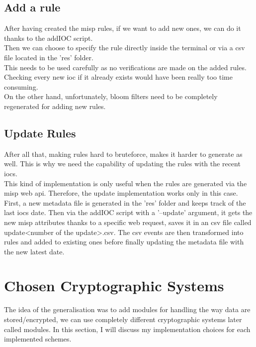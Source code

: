\documentclass{eplmastersthesis}
\begin{document}
\subsection{Add a rule}
After having created the \gls{misp} rules, if we want to add new ones, we can do it thanks to the addIOC script.\\
Then we can choose to specify the rule directly inside the terminal or via a \gls{csv} file located in the 'res' folder.\\
This needs to be used carefully as no verifications are made on the added rules. Checking every new \gls{ioc} if it already exists would have been really too time consuming.\\
On the other hand, unfortunately, bloom filters need to be completely regenerated for adding new rules.

\subsection{Update Rules}
After all that, making rules hard to bruteforce, makes it harder to generate as well. This is why we need the capability of updating the rules with the recent \gls{ioc}s.\\
This kind of implementation is only useful when the rules are generated via the \gls{misp} web \gls{api}. Therefore, the update implementation works only in this case.\\
First, a new metadata file is generated in the 'res' folder and keeps track of the last \gls{ioc}s date. Then via the addIOC script with a '--update' argument, it gets the new \gls{misp} attributes thanks to a specific web request, saves it in an \gls{csv} file called update<number of the update>.csv.
The \gls{csv} events are then transformed into rules and added to existing ones before finally updating the metadata file with the new latest date.

\section{Chosen Cryptographic Systems}
The idea of the generalisation was to add modules for handling the way data are stored/encrypted, we can use completely different cryptographic systems later called modules. In this section, I will discuss my implementation choices for each implemented schemes.
\end{document}
